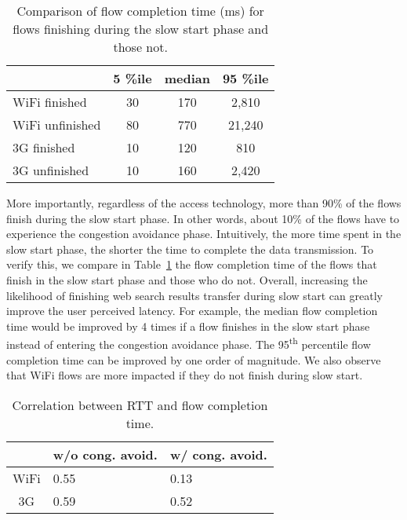 \begin{table}[th]
\caption{Comparison of flow completion time (ms) for flows finishing during the slow start phase and those not.}
\label{tab:web_finish_time_3rd_phase}
\centering
\renewcommand{\arraystretch}{1.0}
\begin{tabular}{l|c|c|c}
\hline
& 5 \%ile & median & 95 \%ile \\
\hline
WiFi finished & 30 & 170 & 2,810 \\
WiFi unfinished & 80 & 770 & 21,240 \\
\hline
3G finished & 10 & 120 & 810 \\
3G unfinished & 10 & 160 & 2,420 \\
\hline
\end{tabular}
\minsqueeze
\end{table}

More importantly, regardless of the access technology, more than 90\% of the flows finish during the slow start phase. In other words, about 10\% of the flows have to experience the congestion avoidance phase. Intuitively, the more time spent in the slow start phase, the shorter the time to complete the data transmission. To verify this, we compare in Table~\ref{tab:web_finish_time_3rd_phase} the flow completion time of the flows that finish in the slow start phase and those who do not. Overall, increasing the likelihood of finishing web search results transfer during slow start can greatly improve the user perceived latency. For example, the median flow completion time would be improved by 4 times if a flow finishes in the slow start phase instead of entering the congestion avoidance phase. The 95\textsuperscript{th} percentile flow completion time can be improved by one order of magnitude. We also observe that WiFi flows are more impacted if they do not finish during slow start.

\begin{table}[th]
\caption{Correlation between RTT and flow completion time.}
\label{tab:web_rtt_finish_time_correlation}
\centering
\renewcommand{\arraystretch}{1.0}
\begin{tabular}{c|C{2.6cm}|C{2.5cm}}
   \hline
   & w/o cong. avoid. & w/ cong. avoid. \\
   \hline
   WiFi & 0.55 & 0.13 \\
   3G & 0.59 & 0.52 \\
   \hline
\end{tabular}
\minsqueeze
\end{table}


